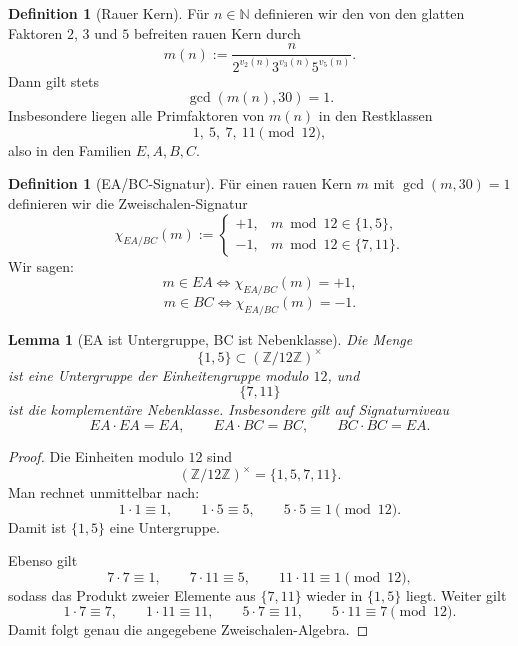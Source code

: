 \documentclass[11pt,a4paper]{article}
\newtheorem{lemma}[satz]{Lemma}
\theoremstyle{definition}
\newtheorem{definition}[satz]{Definition}
\theoremstyle{remark}
\begin{document}
	\begin{definition}[Rauer Kern]
		Für \(n\in\mathbb N\) definieren wir den von den glatten Faktoren \(2\), \(3\) und \(5\)
		befreiten rauen Kern durch
		\[
		m(n):=\frac{n}{2^{v_2(n)}3^{v_3(n)}5^{v_5(n)}}.
		\]
		Dann gilt stets
		\[
		\gcd(m(n),30)=1.
		\]
		Insbesondere liegen alle Primfaktoren von \(m(n)\) in den Restklassen
		\[
		1,\ 5,\ 7,\ 11 \pmod{12},
		\]
		also in den Familien \(E,A,B,C\).
	\end{definition}
	
	\begin{definition}[EA/BC-Signatur]
		\label{def:eabc_zweischale}
		Für einen rauen Kern \(m\) mit \(\gcd(m,30)=1\) definieren wir die Zweischalen-Signatur
		\[
		\chi_{EA/BC}(m):=
		\begin{cases}
			+1,& m\bmod 12\in\{1,5\},\\[1mm]
			-1,& m\bmod 12\in\{7,11\}.
		\end{cases}
		\]
		Wir sagen:
		\[
		m\in EA
		\iff
		\chi_{EA/BC}(m)=+1,
		\]
		\[
		m\in BC
		\iff
		\chi_{EA/BC}(m)=-1.
		\]
	\end{definition}
	
	\begin{lemma}[EA ist Untergruppe, BC ist Nebenklasse]
		\label{lem:eabc_untergruppe}
		Die Menge
		\[
		\{1,5\}\subset (\mathbb Z/12\mathbb Z)^\times
		\]
		ist eine Untergruppe der Einheitengruppe modulo \(12\), und
		\[
		\{7,11\}
		\]
		ist die komplementäre Nebenklasse. Insbesondere gilt auf Signaturniveau
		\[
		EA\cdot EA=EA,\qquad
		EA\cdot BC=BC,\qquad
		BC\cdot BC=EA.
		\]
	\end{lemma}
	
	\begin{proof}
		Die Einheiten modulo \(12\) sind
		\[
		(\mathbb Z/12\mathbb Z)^\times=\{1,5,7,11\}.
		\]
		Man rechnet unmittelbar nach:
		\[
		1\cdot 1\equiv 1,\qquad
		1\cdot 5\equiv 5,\qquad
		5\cdot 5\equiv 1 \pmod{12}.
		\]
		Damit ist \(\{1,5\}\) eine Untergruppe.
		
		Ebenso gilt
		\[
		7\cdot 7\equiv 1,\qquad
		7\cdot 11\equiv 5,\qquad
		11\cdot 11\equiv 1 \pmod{12},
		\]
		sodass das Produkt zweier Elemente aus \(\{7,11\}\) wieder in \(\{1,5\}\) liegt. Weiter
		gilt
		\[
		1\cdot 7\equiv 7,\qquad
		1\cdot 11\equiv 11,\qquad
		5\cdot 7\equiv 11,\qquad
		5\cdot 11\equiv 7 \pmod{12}.
		\]
		Damit folgt genau die angegebene Zweischalen-Algebra.
	\end{proof}
	
\end{document}
